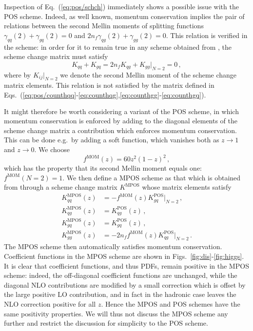 Inspection of Eq.~(\ref{eq:pos/schch}) immediately shows a possible issue
with the POS scheme. Indeed, as well known, momentum conservation
implies the pair of relations between the second Mellin moments of splitting
functions $\gamma_{qq}(2)+\gamma_{gq}(2)=0$ and
 $2n_f\gamma_{qg}(2)+\gamma_{gg}(2)=0$. This relation is verified in the
\msbar{} scheme:  in order for it to remain true  in any scheme obtained
from \msbar{}, the scheme change matrix must satisfy
\begin{equation}\label{eq:pos/momcons}
  K_{qq}+K_{gq}=2n_fK_{qg}+K_{gg}\Big|_{N=2}=0 \,,
\end{equation}
where by $K_{ij}\Big|_{N=2}$ we denote the second Mellin moment of the
scheme change matrix elements. This relation is not satisfied by the matrix defined in
Eqs.~(\ref{eq:pos/counthqq}-\ref{eq:counthqg},\ref{eq:counthgg}-\ref{eq:counthgq}).

It might therefore be worth considering a variant of the POS scheme,
in which momentum conservation is enforced by adding to the diagonal
elements of the scheme change matrix a contribution which enforces
momentum conservation. This can be done e.g.\ by adding a soft
function, which vanishes both as $z\to1$ and $z \to0$. We choose
\begin{equation}\label{eq:pos/fmom}
  f^{\textrm{MOM}}(z)= 60 z^2(1-z)^2\,,
\end{equation}
which has the property that its second Mellin moment equals one:
$f^{\textrm{MOM}}(N=2)=1$. We then define a MPOS scheme as that which is obtained
from \msbar{} through a scheme change matrix $K^{\textrm{MPOS}}$ whose
matrix elements satisfy
\begin{align}
  \label{eq:pos/mposqq}
  K^{\textrm{MPOS}}_{qq}(z)&= - f^{\textrm{MOM}}(z) K^{\textrm{POS}}_{gq}\Big|_{N=2} \,,\\
  \label{eq:pos/mposqg}
  K^{\textrm{MPOS}}_{qg}(z)&= K^{\textrm{POS}}_{qg}(z) \,,\\
  \label{eq:pos/mposgq}
  K^{\textrm{MPOS}}_{gq}(z)&= K^{\textrm{POS}}_{gq}(z) \,,\\
  \label{eq:pos/mposgg}
  K^{\textrm{MPOS}}_{gg}(z)&= -2n_f f^{\textrm{MOM}}(z) K^{\textrm{POS}}_{qg}\Big|_{N=2} \,.
\end{align}
The MPOS scheme then automatically satisfies momentum
conservation. Coefficient functions in the MPOS scheme are shown in
Figs.~\ref{fig:dis}-\ref{fig:higgs}. It is clear that coefficient
functions, and thus PDFs, remain
positive in the MPOS scheme: indeed, the off-diagonal coefficient
functions are unchanged, while the diagonal NLO contributions are
modified by a small correction which is offset by the large positive
LO contribution, and in fact in the hadronic case leaves the NLO
correction positive for all $z$. Hence the MPOS and POS schemes have the same
positivity properties. We will thus not discuss the MPOS scheme
any further and restrict the discussion for simplicity to the POS
scheme.

